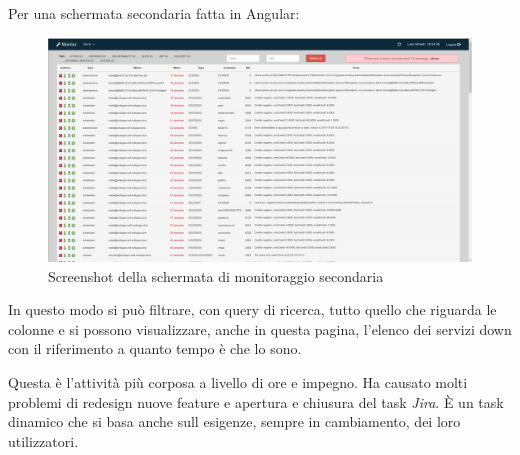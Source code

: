 \documentclass[a4paper]{article}
\begin{document}
Per una schermata secondaria fatta in Angular:
\begin{figure}[H]
	\includegraphics[width=\textwidth]{issue_new.png}
	\centering
	\caption{Screenshot della schermata di monitoraggio secondaria}
\end{figure}
\par In questo modo si può filtrare, con query di ricerca, tutto quello che riguarda le colonne
e si possono visualizzare, anche in questa pagina, l'elenco dei servizi down con il 
riferimento a quanto tempo è che lo sono. 
\par Questa è l'attività più corposa a livello di ore e impegno. Ha causato molti problemi di 
redesign nuove feature e apertura e chiusura del task \emph{Jira}. È un task dinamico
che si basa anche sull esigenze, sempre in cambiamento, dei loro utilizzatori.
\end{document}
